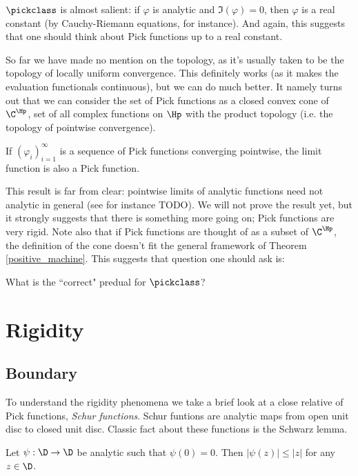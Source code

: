 $\pickclass$ is almost salient: if $\varphi$ is analytic and $\Im(\varphi) = 0$, then $\varphi$ is a real constant (by Cauchy-Riemann equations, for instance). And again, this suggests that one should think about Pick functions up to a real constant.

So far we have made no mention on the topology, as it's usually taken to be the topology of locally uniform convergence. This definitely works (as it makes the evaluation functionals continuous), but we can do much better. It namely turns out that we can consider the set of Pick functions as a closed convex cone of $\C^{\Hp}$, set of all complex functions on $\Hp$ with the product topology (i.e. the topology of pointwise convergence).

\begin{prop}\label{pick_convergence}
	If $(\varphi_{i})_{i = 1}^{\infty}$ is a sequence of Pick functions converging pointwise, the limit function is also a Pick function.
\end{prop}

This result is far from clear: pointwise limits of analytic functions need not analytic in general (see for instance TODO). We will not prove the result yet, but it strongly suggests that there is something more going on; Pick functions are very rigid. Note also that if Pick functions are thought of as a subset of $\C^{\Hp}$, the definition of the cone doesn't fit the general framework of Theorem \ref{positive_machine}. This suggests that question one should ask is:

\begin{quest}\label{pick_predual}
	What is the ``correct" predual for $\pickclass$?
\end{quest}


\section{Rigidity}

\subsection{Boundary}

To understand the rigidity phenomena we take a brief look at a close relative of Pick functions, \textit{Schur functions}. Schur funtions are analytic maps from open unit disc to closed unit disc. Classic fact about these functions is the Schwarz lemma.

\begin{lause}
	Let $\psi : \D \to \D$ be analytic such that $\psi(0) = 0$. Then $|\psi(z)| \leq |z|$ for any $z \in \D$.
\end{lause}

